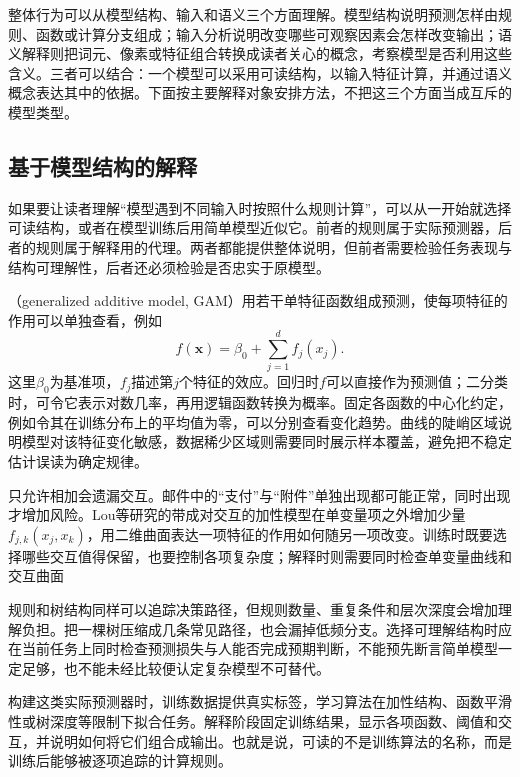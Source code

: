 整体行为可以从模型结构、输入和语义三个方面理解。模型结构说明预测怎样由规则、函数或计算分支组成；输入分析说明改变哪些可观察因素会怎样改变输出；语义解释则把词元、像素或特征组合转换成读者关心的概念，考察模型是否利用这些含义。三者可以结合：一个模型可以采用可读结构，以输入特征计算，并通过语义概念表达其中的依据。下面按主要解释对象安排方法，不把这三个方面当成互斥的模型类型。

\subsection{基于模型结构的解释}
\label{sec:interpretability-global-response}

如果要让读者理解“模型遇到不同输入时按照什么规则计算”，可以从一开始就选择可读结构，或者在模型训练后用简单模型近似它。前者的规则属于实际预测器，后者的规则属于解释用的代理。两者都能提供整体说明，但前者需要检验任务表现与结构可理解性，后者还必须检验是否忠实于原模型。

（generalized additive model, GAM）用若干单特征函数组成预测，使每项特征的作用可以单独查看，例如
\begin{equation}
 f(\bm{x})=\beta_0+\sum_{j=1}^{d}f_j(x_j).
 \label{eq:interpretability-gam}
\end{equation}
这里$\beta_0$为基准项，$f_j$描述第$j$个特征的效应。回归时$f$可以直接作为预测值；二分类时，可令它表示对数几率，再用逻辑函数转换为概率。固定各函数的中心化约定，例如令其在训练分布上的平均值为零，可以分别查看变化趋势。曲线的陡峭区域说明模型对该特征变化敏感，数据稀少区域则需要同时展示样本覆盖，避免把不稳定估计误读为确定规律。

只允许相加会遗漏交互。邮件中的“支付”与“附件”单独出现都可能正常，同时出现才增加风险。Lou等研究的带成对交互的加性模型在单变量项之外增加少量$f_{j,k}(x_j,x_k)$，用二维曲面表达一项特征的作用如何随另一项改变。训练时既要选择哪些交互值得保留，也要控制各项复杂度；解释时则需要同时检查单变量曲线和交互曲面

规则和树结构同样可以追踪决策路径，但规则数量、重复条件和层次深度会增加理解负担。把一棵树压缩成几条常见路径，也会漏掉低频分支。选择可理解结构时应在当前任务上同时检查预测损失与人能否完成预期判断，不能预先断言简单模型一定足够，也不能未经比较便认定复杂模型不可替代。

构建这类实际预测器时，训练数据提供真实标签，学习算法在加性结构、函数平滑性或树深度等限制下拟合任务。解释阶段固定训练结果，显示各项函数、阈值和交互，并说明如何将它们组合成输出。也就是说，可读的不是训练算法的名称，而是训练后能够被逐项追踪的计算规则。


